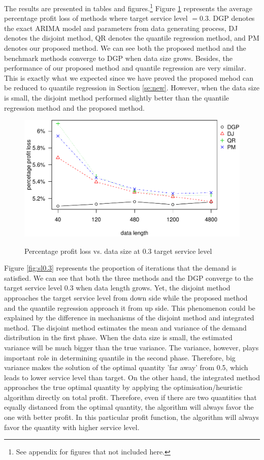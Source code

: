 \documentclass{article}
\begin{document}
The results are presented in tables and figures.\footnote{See appendix for figures that not included here.} Figure \ref{fig:ppl0.3} represents the average percentage profit loss of methods where target service level $=0.3$. DGP denotes the exact ARIMA model and parameters from data generating process, DJ denotes the disjoint method, QR denotes the quantile regression method, and PM denotes our proposed method. We can see both the proposed method and the benchmark methods converge to DGP when data size grows. Besides, the performance of our proposed method and quantile regression are very similar. This is exactly what we expected since we have proved the proposed mehod can be reduced to quantile regression in Section \ref{se:new}. However, when the data size is small, the disjoint method performed slightly better than the quantile regression method and the proposed method. 

\begin{figure}[ht]
\centering
\caption{Percentage profit loss vs. data size at 0.3 target service level}
\includegraphics{linear-norm-plot_files/figure-latex/ppl0.3-1.pdf}
\label{fig:ppl0.3}
\end{figure}

Figure \ref{fig:sl0.3} represents the proportion of iterations that the demand is satisfied. We can see that both the three methods and the DGP converge to the target service level 0.3 when data length grows. Yet, the disjoint method approaches the target service level from down side while the proposed method and the quantile regression approach it from up side. This phenomenon could be explained by the difference in mechanisms of the disjoint method and integrated method. The disjoint method estimates the mean and variance of the demand distribution in the first phase. When the data size is small, the estimated variance will be much bigger than the true variance. The variance, however, plays important role in determining quantile in the second phase. Therefore, big variance makes the solution of the optimal quantity 'far away' from 0.5, which leads to lower service level than target. On the other hand, the integrated method approaches the true optimal quantity by applying the optimisation/heuristic algorithm directly on total profit. Therefore, even if there are two quantities that equally distanced from the optimal quantity, the algorithm will always favor the one with better profit. In this particular profit function, the algorithm will always favor the quantity with higher service level.
\end{document}
